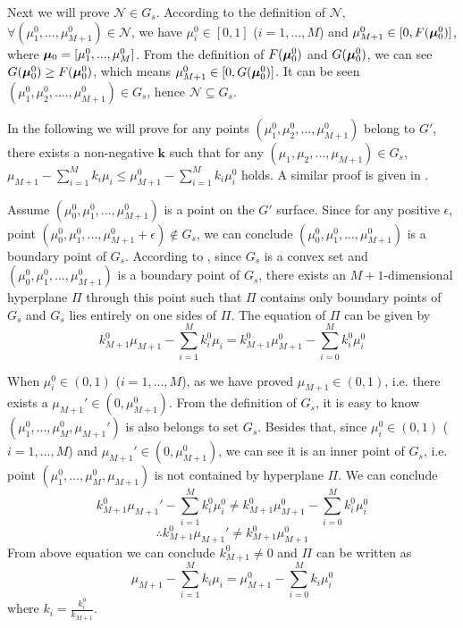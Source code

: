 \documentclass[12pt,journal,a4paper,twoside,onecolumn]{IEEEtran}
\begin{document}
\begin{spacing}{2.5}
Next we will prove $\mathcal{N} \in G_s$. 
According to the definition of $\mathcal{N}$, $\forall (\mu_1^0, ..., \mu_{M+1}^0) \in \mathcal{N}$, we have $\mu_i^0 \in [0, 1]$ ($i = 1, ..., M$) and $\mu_{M+1}^0 \in [0, F(\boldsymbol{\mu}_0^0)]$, where $\boldsymbol{\mu}_0 = [\mu_1^0, ..., \mu_M^0]$. From the definition of $F(\boldsymbol{\mu}_0^0)$ and $G(\boldsymbol{\mu}_0^0)$, we can see $G(\boldsymbol{\mu}_0^0) \geq F(\boldsymbol{\mu}_0^0)$, which means $\mu_{M+1}^0 \in [0, G(\boldsymbol{\mu}_0^0)]$. It can be seen $(\mu_1^0, \mu_2^0, ...., \mu_{M+1}^0) \in G_s$, hence $\mathcal{N} \subseteq G_s$.

In the following we will prove for any points $(\mu_1^0, \mu_2^0, ..., \mu_{M+1}^0)$ belong to $G'$, there exists a non-negative $\mathbf{k}$ such that for any $(\mu_1, \mu_2, ..., \mu_{M+1}) \in G_s$, $\mu_{M+1} - \sum_{i=1}^{M}k_i\mu_i \leq \mu_{M+1}^0 - \sum_{i=1}^{M}k_i\mu_i^0$ holds. A similar proof is given in \cite{LehmannTest, dantzig1951fundamental}.

Assume $(\mu_0^0, \mu_1^0, ..., \mu_{M+1}^0)$ is a point on the $G'$ surface. Since for any positive $\epsilon$, point $(\mu_0^0, \mu_1^0, ..., \mu_{M+1}^0+\epsilon) \notin G_s$, we can conclude $(\mu_0^0, \mu_1^0, ..., \mu_{M+1}^0)$ is a boundary point of $G_s$. According to \cite{LehmannTest, dantzig1951fundamental}, since $G_s$ is a convex set and $(\mu_0^0, \mu_1^0, ..., \mu_{M+1}^0)$ is a boundary point of $G_s$,  
there exists an $M+1$-dimensional hyperplane $\Pi$ through this point such that $\Pi$ contains only boundary points of $G_s$ and $G_s$ lies entirely on one sides of $\Pi$.  The equation of $\Pi$ can be given by 
\begin{equation}
\label{PI}
k_{M+1}^0\mu_{M+1} - \sum_{i=1}^{M}k_i^0\mu_i = k_{M+1}^0\mu_{M+1}^0 - \sum_{i=0}^{M}k_i^0\mu_i^0
\end{equation}

When $\mu^0_i \in (0, 1)$ ($i=1, ..., M$), as we have proved $\mu_{M+1} \in  (0, 1)$, i.e. there exists a $\mu_{M+1}' \in (0, \mu_{M+1}^0)$. From the definition of $G_s$, it is easy to know $(\mu^0_1, ..., \mu^0_M, \mu_{M+1}')$ is also belongs to set $G_s$. Besides that, since $\mu^0_i \in (0, 1)$ ($i=1, ..., M$) and $\mu_{M+1}' \in (0, \mu_{M+1}^0)$, we can see it is an inner point of $G_s$, i.e. point $(\mu^0_1, ..., \mu^0_M, \mu_{M+1})$ is not contained by hyperplane $\Pi$. We can conclude 
\[
k_{M+1}^0\mu_{M+1}' - \sum_{i=1}^{M}k_i^0\mu_i^0 \neq k_{M+1}^0\mu_{M+1}^0 - \sum_{i=0}^{M}k_i^0\mu_i^0
\]
\[
\therefore k_{M+1}^0\mu_{M+1}' \neq k_{M+1}^0\mu_{M+1}^0
\]
From above equation we can conclude $k_{M+1}^0 \neq 0$ and $\Pi$ can be written as
\begin{equation}
\label{PI2}
\mu_{M+1} - \sum_{i=1}^{M}k_i\mu_i = \mu_{M+1}^0 - \sum_{i=0}^{M}k_i\mu_i^0
\end{equation}
where $k_i = \frac{k_i^0}{k_{M+1}}$. 


\end{spacing}
\end{document}
